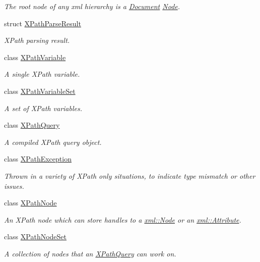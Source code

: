 \begin{DoxyCompactItemize}
\begin{DoxyCompactList}\small\item\em The root node of any xml hierarchy is a \hyperlink{classphys_1_1xml_1_1Document}{Document} \hyperlink{classphys_1_1xml_1_1Node}{Node}. \item\end{DoxyCompactList}\item 
struct \hyperlink{structphys_1_1xml_1_1XPathParseResult}{XPathParseResult}
\begin{DoxyCompactList}\small\item\em XPath parsing result. \item\end{DoxyCompactList}\item 
class \hyperlink{classphys_1_1xml_1_1XPathVariable}{XPathVariable}
\begin{DoxyCompactList}\small\item\em A single XPath variable. \item\end{DoxyCompactList}\item 
class \hyperlink{classphys_1_1xml_1_1XPathVariableSet}{XPathVariableSet}
\begin{DoxyCompactList}\small\item\em A set of XPath variables. \item\end{DoxyCompactList}\item 
class \hyperlink{classphys_1_1xml_1_1XPathQuery}{XPathQuery}
\begin{DoxyCompactList}\small\item\em A compiled XPath query object. \item\end{DoxyCompactList}\item 
class \hyperlink{classphys_1_1xml_1_1XPathException}{XPathException}
\begin{DoxyCompactList}\small\item\em Thrown in a variety of XPath only situations, to indicate type mismatch or other issues. \item\end{DoxyCompactList}\item 
class \hyperlink{classphys_1_1xml_1_1XPathNode}{XPathNode}
\begin{DoxyCompactList}\small\item\em An XPath node which can store handles to a \hyperlink{classphys_1_1xml_1_1Node}{xml::Node} or an \hyperlink{classphys_1_1xml_1_1Attribute}{xml::Attribute}. \item\end{DoxyCompactList}\item 
class \hyperlink{classphys_1_1xml_1_1XPathNodeSet}{XPathNodeSet}
\begin{DoxyCompactList}\small\item\em A collection of nodes that an \hyperlink{classphys_1_1xml_1_1XPathQuery}{XPathQuery} can work on. \item\end{DoxyCompactList}\end{DoxyCompactItemize}
